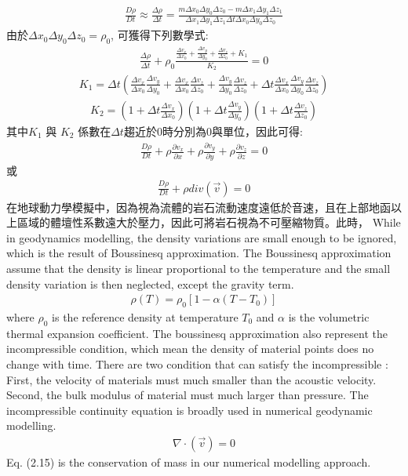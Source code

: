 \begin{align}
\frac{D\rho}{Dt} \approx \frac{\Delta \rho}{\Delta t} =\frac{m\Delta x_0 \Delta y_0 \Delta z_0-m\Delta x_1 \Delta y_1 \Delta z_1}{\Delta x_1 \Delta y_1 \Delta z_1\Delta t\Delta x_0 \Delta y_0 \Delta z_0}\label{eqn:Drho-Dt2}
\end{align}
由於$\Delta x_0 \Delta y_0 \Delta z_0=\rho_0$, 可獲得下列數學式:
\begin{align}
\frac{\Delta \rho}{\Delta t}+\rho_0\frac{\frac{\Delta v_x}{\Delta x_0}+\frac{\Delta v_y}{\Delta y_0}+\frac{\Delta v_z}{\Delta z_0}+K_1}{K_2} = 0
\end{align}
\begin{align}
K_1 = \Delta t(\frac{\Delta v_x}{\Delta x_0}\frac{\Delta v_y}{\Delta y_0}+\frac{\Delta v_x}{\Delta x_0}\frac{\Delta v_z}{\Delta z_0}+\frac{\Delta v_y}{\Delta y_0}\frac{\Delta v_z}{\Delta z_0}+\Delta t \frac{\Delta v_x}{\Delta x_0}\frac{\Delta v_y}{\Delta y_0}\frac{\Delta v_z}{\Delta z_0})
\end{align}
\begin{align}
K_2=(1+\Delta t\frac{\Delta v_x}{\Delta x_0})(1+\Delta t\frac{\Delta v_y}{\Delta y_0})(1+\Delta t\frac{\Delta v_z}{\Delta z_0})
\end{align}
其中$K_1$ 與 $K_2$ 係數在$\Delta t$趨近於$0$時分別為$0$與單位，因此可得:
\begin{align}
\frac{D\rho}{Dt}+\rho\frac{\partial v_x}{\partial x}+\rho\frac{\partial v_y}{\partial y}+\rho\frac{\partial v_z}{\partial z} = 0
\end{align}
或
\begin{align}
\frac{D\rho}{Dt}+\rho div(\vec v) = 0
\end{align}
在地球動力學模擬中，因為視為流體的岩石流動速度遠低於音速，且在上部地函以上區域的體壇性系數遠大於壓力，因此可將岩石視為不可壓縮物質。此時，
While in geodynamics modelling, the density variations are small enough to be ignored, which is the result of Boussinesq approximation. The Boussinesq approximation assume that the density is linear proportional to the temperature and the small density variation is then neglected, except the gravity term.
\begin{align}
\rho (T) = \rho_0[1-\alpha (T-T_0)] 
\end{align}
where $\rho_0$ is the reference density at temperature $T_0$ and $\alpha$ is the volumetric thermal expansion coefficient. The boussinesq approximation also represent the incompressible condition, which mean the density of material points does no change with time. There are two condition that can satisfy the incompressible : First, the velocity of materials must much smaller than the acoustic velocity. Second, the bulk modulus of material must much larger than pressure. The incompressible continuity equation is broadly used in numerical geodynamic modelling. 
\begin{align}
\nabla \cdot (\vec v) = 0 
\end{align}
Eq. (2.15) is the conservation of mass in our numerical modelling approach.

